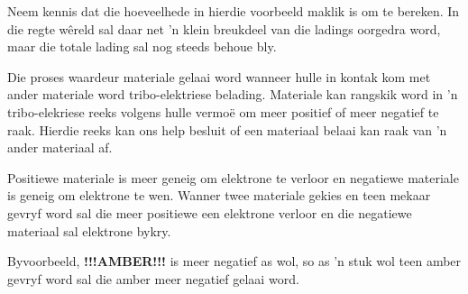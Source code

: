 \begin{minipage}{.35\textwidth}

Neem kennis dat die hoeveelhede in hierdie voorbeeld maklik is om te bereken. In die regte w\^ereld sal daar net 'n klein breukdeel van die ladings oorgedra word, maar die totale lading sal nog steeds behoue bly. \par

Die proses waardeur materiale gelaai word wanneer hulle in kontak kom met ander materiale word tribo-elektriese belading. Materiale kan rangskik word in 'n tribo-elekriese reeks volgens hulle vermo\"e om meer positief of meer negatief te raak. Hierdie reeks kan ons help besluit of een materiaal belaai kan raak van 'n ander materiaal af.

Positiewe materiale is meer geneig om elektrone te verloor en negatiewe materiale is geneig om elektrone te wen. Wanner twee materiale gekies en teen mekaar gevryf word sal die meer positiewe een elektrone verloor en die negatiewe materiaal sal elektrone bykry.

Byvoorbeeld, \textbf{!!!AMBER!!! } is meer negatief as wol, so as 'n stuk wol teen amber gevryf word sal die amber meer negatief gelaai word.
\end{minipage}
